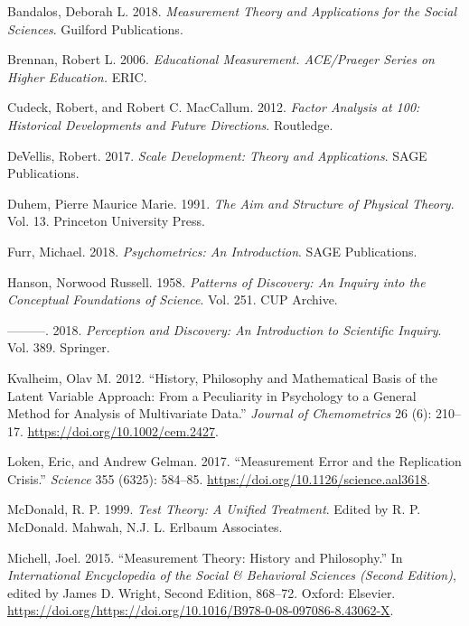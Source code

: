 \documentclass[11pt,]{article}
\begin{document}
\newpage

\hypertarget{refs}{}
\leavevmode\hypertarget{ref-Bandalos2018}{}%
Bandalos, Deborah L. 2018. \emph{Measurement Theory and Applications for
the Social Sciences}. Guilford Publications.

\leavevmode\hypertarget{ref-Brennan2006}{}%
Brennan, Robert L. 2006. \emph{Educational Measurement. ACE/Praeger
Series on Higher Education.} ERIC.

\leavevmode\hypertarget{ref-Cudeck2012}{}%
Cudeck, Robert, and Robert C. MacCallum. 2012. \emph{Factor Analysis at
100: Historical Developments and Future Directions}. Routledge.

\leavevmode\hypertarget{ref-DeVellis2017}{}%
DeVellis, Robert. 2017. \emph{Scale Development: Theory and
Applications}. SAGE Publications.

\leavevmode\hypertarget{ref-Duhem1991}{}%
Duhem, Pierre Maurice Marie. 1991. \emph{The Aim and Structure of
Physical Theory}. Vol. 13. Princeton University Press.

\leavevmode\hypertarget{ref-Furr2018}{}%
Furr, Michael. 2018. \emph{Psychometrics: An Introduction}. SAGE
Publications.

\leavevmode\hypertarget{ref-Hanson1958}{}%
Hanson, Norwood Russell. 1958. \emph{Patterns of Discovery: An Inquiry
into the Conceptual Foundations of Science}. Vol. 251. CUP Archive.

\leavevmode\hypertarget{ref-Hanson2018}{}%
---------. 2018. \emph{Perception and Discovery: An Introduction to
Scientific Inquiry}. Vol. 389. Springer.

\leavevmode\hypertarget{ref-Kvalheim2012}{}%
Kvalheim, Olav M. 2012. ``History, Philosophy and Mathematical Basis of
the Latent Variable Approach: From a Peculiarity in Psychology to a
General Method for Analysis of Multivariate Data.'' \emph{Journal of
Chemometrics} 26 (6): 210--17. \url{https://doi.org/10.1002/cem.2427}.

\leavevmode\hypertarget{ref-Loken2017}{}%
Loken, Eric, and Andrew Gelman. 2017. ``Measurement Error and the
Replication Crisis.'' \emph{Science} 355 (6325): 584--85.
\url{https://doi.org/10.1126/science.aal3618}.

\leavevmode\hypertarget{ref-McDonald1999}{}%
McDonald, R. P. 1999. \emph{Test Theory: A Unified Treatment}. Edited by
R. P. McDonald. Mahwah, N.J. L. Erlbaum Associates.

\leavevmode\hypertarget{ref-Michell2015}{}%
Michell, Joel. 2015. ``Measurement Theory: History and Philosophy.'' In
\emph{International Encyclopedia of the Social \& Behavioral Sciences
(Second Edition)}, edited by James D. Wright, Second Edition, 868--72.
Oxford: Elsevier.
\url{https://doi.org/https://doi.org/10.1016/B978-0-08-097086-8.43062-X}.
\end{document}
